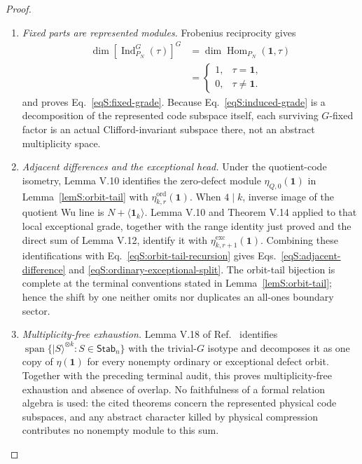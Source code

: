 \documentclass[journal,twocolumn]{IEEEtran}
\theoremstyle{definition}
\theoremstyle{plain}
\newcommand{\Stab}{\mathsf{Stab}}
\newcommand{\Ord}{\mathrm{ord}}
\newcommand{\Exc}{\mathrm{exc}}
\newcommand{\one}{\bm 1}
\begin{document}
\begin{proof}
\begin{enumerate}
\item \emph{Fixed parts are represented modules.}
Frobenius reciprocity gives
\begin{equation}
 \begin{aligned}
 \dim\!\left[\operatorname{Ind}_{P_N}^{G}(\tau)\right]^G
 &=\dim\operatorname{Hom}_{P_N}(\bm1,\tau)\\
 &=\begin{cases}1,&\tau=\bm1,\\0,&\tau\ne\bm1.\end{cases}
 \end{aligned}
 \label{eqS:Frobenius}
\end{equation}
and proves Eq.~\eqref{eqS:fixed-grade}.  Because
Eq.~\eqref{eqS:induced-grade} is a decomposition of the represented code
subspace itself, each surviving $G$-fixed factor is an actual
Clifford-invariant subspace there, not an abstract multiplicity space.

\item \emph{Adjacent differences and the exceptional head.}
Under the quotient-code isometry, Lemma V.10 identifies the zero-defect
module $\eta_{Q,0}(\bm1)$ in Lemma~\ref{lemS:orbit-tail} with
$\eta^{\Ord}_{k,r}(\bm1)$.  When $4\mid k$, inverse image of the quotient Wu
line is $N+\langle\one_k\rangle$.  Lemma V.10 and Theorem V.14 applied to
that local exceptional grade, together with the range identity just proved
and the direct sum of Lemma V.12, identify it with
$\eta^{\Exc}_{k,r+1}(\bm1)$.  Combining these identifications with
Eq.~\eqref{eqS:orbit-tail-recursion} gives
Eqs.~\eqref{eqS:adjacent-difference} and
\eqref{eqS:ordinary-exceptional-split}.  The orbit-tail bijection is complete
at the terminal conventions stated in Lemma~\ref{lemS:orbit-tail}; hence the
shift by one neither omits nor duplicates an all-ones boundary sector.

\item \emph{Multiplicity-free exhaustion.}
Lemma V.18 of Ref.~\cite{MontealegreGross2025} identifies
$\operatorname{span}\{|S\rangle^{\otimes k}:S\in\Stab_n\}$ with the
trivial-$G$ isotype and decomposes it as one copy of $\eta(\bm1)$ for every
nonempty ordinary or exceptional defect orbit.  Together with the preceding
terminal audit, this proves multiplicity-free exhaustion and absence of
overlap.  No faithfulness of a formal relation algebra is used: the cited
theorems concern the represented physical code subspaces, and any abstract
character killed by physical compression contributes no nonempty module to
this sum.


\end{enumerate}
\end{proof}
\end{document}
